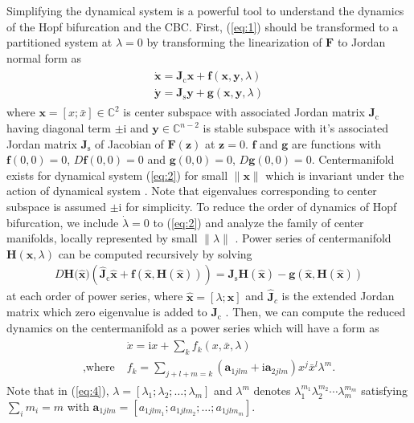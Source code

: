 \documentclass[openacc]{rsproca_new}%
\def\complex{\mathbb{C}}
\def\vec#1{\ensuremath{\mathbf{#1}}}
\newcommand{\Eref}[1]{(\ref{#1})}
\begin{document}
Simplifying the dynamical system is a powerful tool to understand the dynamics of the Hopf bifurcation and the CBC. First, \Eref{eq:1} should be transformed to a partitioned system at \(\lambda=0\) by transforming the linearization of \(\vec{F}\) to Jordan normal form as
\begin{align}\label{eq:2}
  \begin{split}
    \dot{\vec{x}} =\vec{J}_\textrm{c} \vec{x} + \vec{f}(\vec{x},\vec{y},\lambda)\\
    \dot{\vec{y}} =\vec{J}_\textrm{s} \vec{y} +\vec{g}(\vec{x},\vec{y},\lambda)
  \end{split}
\end{align}
where $\vec{x}=[x;\bar{x}]\in \complex^2$ is center subspace with associated Jordan matrix $\vec{J}_\textrm{c}$ having diagonal term $\pm\textrm{i}$ and $\vec{y}\in \complex^{n-2}$ is stable subspace with it's associated Jordan matrix $\vec{J}_\textrm{s}$ of Jacobian of $\vec{F}(\vec{z})$ at $\vec{z}=0$.
$\vec{f}$ and $\vec{g}$ are functions with $\vec{f}(0,0)=0$, $D\vec{f}(0,0)=0$ and $\vec{g}(0,0)=0$, $D\vec{g}(0,0)=0$. Centermanifold exists for dynamical system \Eref{eq:2} for small  $\|\vec{x}\|$ which is invariant under the action of dynamical system \cite{carr2012applications}. Note that eigenvalues corresponding to center subspace is assumed $\pm\textrm{i}$ for simplicity. To reduce the order of dynamics of Hopf bifurcation, we include $\dot\lambda=0$ to \Eref{eq:2} and analyze the family of center manifolds, locally represented by small $\|\lambda\|$  \cite{kuznetsov2013elements}. Power series of centermanifold $\vec{H}(\vec{x},\lambda)$ can be computed recursively by solving
\begin{align}\label{eq:3}
    D\vec{H}({\vec{\hat{x})}}(\vec{\hat{J}}_\textrm{c}\vec{\hat{x}}+\vec{f}(\vec{\hat{x}},\vec{H}(\vec{\hat{x}}))) =\vec{J}_\textrm{s} \vec{H}(\vec{\hat{x}})-\vec{g}(\vec{\hat{x}},\vec{H}(\vec{\hat {x}}))
\end{align}
at each order of power series, where \(\vec{\hat{x}}=[\lambda;\vec{x}]\) and \(\vec{\hat{J}}_c\) is the extended Jordan matrix which zero eigenvalue is added to \(\vec{J}_\textrm{c}\) \cite{bi1999symbolic}. Then, we can compute the reduced dynamics on the centermanifold as a power series which will have a form as
\begin{align}\label{eq:4}
  \begin{split}
    {}&\dot{x} =\textrm{i} x+\sum_k f_k(x,\bar{x},\lambda)\\
    ,\textrm{where} \; & f_k=\sum_{j+l+m=k}(\vec{a}_{1jlm}+\textrm{i}\vec{a}_{2jlm})x^j\bar{x}^l\lambda^m.
  \end{split}
\end{align}
Note that in \Eref{eq:4}, \(\lambda=[\lambda_1;\lambda_2;\ldots;\lambda_m]\) and \(\lambda^m\) denotes \(\lambda_1^{m_1}\lambda_2^{m_2}\cdots\lambda_m^{m_m}\) satisfying \(\sum_i m_i = m\) with \(\vec{a}_{1jlm}=[a_{1jlm_1};a_{1jlm_2};\ldots;a_{1jlm_m}]\).
\end{document}
